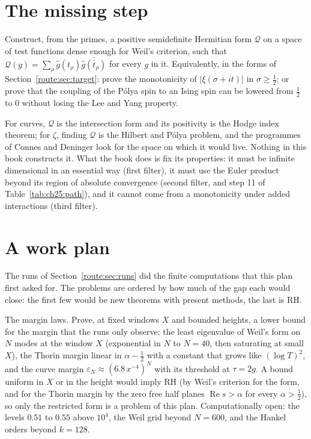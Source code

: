 \section{The missing step}\label{route:sec:missing}

\begin{problem}\label{route:prob:missing}
Construct, from the primes, a positive semidefinite Hermitian form $\mathcal Q$ on a space of test functions dense enough for Weil's criterion, such that $\mathcal Q(g)=\sum_\rho\widehat g(t_\rho)\overline{\widehat g(\bar t_\rho)}$ for every $g$ in it. Equivalently, in the forms of Section~\ref{route:sec:target}: prove the monotonicity of $|\xi(\sigma+it)|$ in $\sigma\ge\frac12$; or prove that the coupling of the P\'olya spin to an Ising spin can be lowered from $\frac12$ to $0$ without losing the Lee and Yang property.
\end{problem}

For curves, $\mathcal Q$ is the intersection form and its positivity is the Hodge index theorem; for $\zeta$, finding $\mathcal Q$ is the Hilbert and P\'olya problem, and the programmes of Connes and Deninger look for the space on which it would live. Nothing in this book constructs it. What the book does is fix its properties: it must be infinite dimensional in an essential way (first filter), it must use the Euler product beyond its region of absolute convergence (second filter, and step 11 of Table~\ref{tab:ch25:path}), and it cannot come from a monotonicity under added interactions (third filter).

\section{A work plan}\label{route:sec:plan}

The runs of Section~\ref{route:sec:runs} did the finite computations that this plan first asked for. The problems are ordered by how much of the gap each would close: the first few would be new theorems with present methods, the last is RH.

\begin{problem}\label{route:prob:margin}
The margin laws. Prove, at fixed windows $X$ and bounded heights, a lower bound for the margin that the runs only observe: the least eigenvalue of Weil's form on $N$ modes at the window $X$ (exponential in $N$ to $N=40$, then saturating at small $X$), the Thorin margin linear in $\alpha-\frac12$ with a constant that grows like $(\log T)^2$, and the curve margin $\varepsilon_N\approx(6.8\,x^{-4})^N$ with its threshold at $\tau=2g$. A bound uniform in $X$ or in the height would imply RH (by Weil's criterion for the form, and for the Thorin margin by the zero free half planes $\operatorname{Re}s>\alpha$ for every $\alpha>\frac12$), so only the restricted form is a problem of this plan. Computationally open: the levels $0.51$ to $0.55$ above $10^4$, the Weil grid beyond $N=600$, and the Hankel orders beyond $k=128$.
\end{problem}

